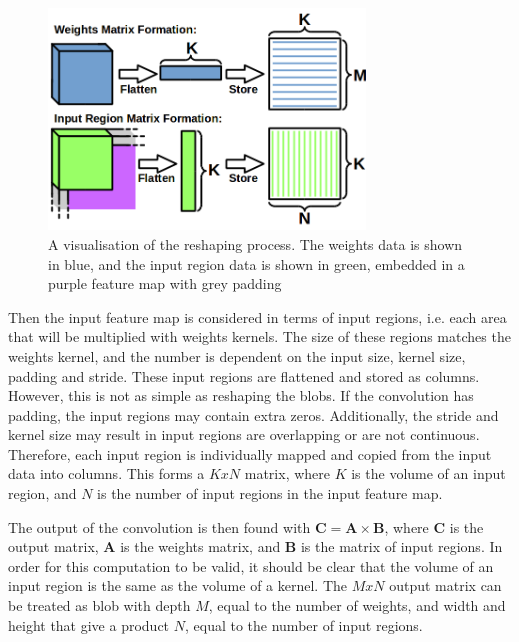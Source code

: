 \documentclass[12pt]{article}
\begin{document}
\begin{figure}[h]
\centering
\includegraphics[width=0.75\textwidth]{../figures/im2col.png}
\caption{A visualisation of the reshaping process. The weights data is shown in blue, and the input region data is shown in green, embedded in a purple feature map with grey padding} \label{fig:im2col}
\end{figure}

Then the input feature map is considered in terms of input regions, i.e. each area that will be multiplied with weights kernels. The size of these regions matches the weights kernel, and the number is dependent on the input size, kernel size, padding and stride.  These input regions are flattened and stored as columns. However, this is not as simple as reshaping the blobs. If the convolution has padding, the input regions may contain extra zeros. Additionally, the stride and kernel size may result in input regions are overlapping or are not continuous. Therefore, each input region is individually mapped and copied from the input data into columns. This forms a $KxN$ matrix, where $K$ is the volume of an input region, and $N$ is the number of input regions in the input feature map.

The output of the convolution is then found with \( \mathbf{C} = \mathbf{A}\times\mathbf{B}\), where $\mathbf{C}$ is the output matrix, $\mathbf{A}$ is the weights matrix, and $\mathbf{B}$ is the matrix of input regions. In order for this computation to be valid, it should be clear that the volume of an input region is the same as the volume of a kernel. The $MxN$ output matrix can be treated as blob with depth $M$, equal to the number of weights, and width and height that give a product $N$, equal to the number of input regions.
\end{document}

